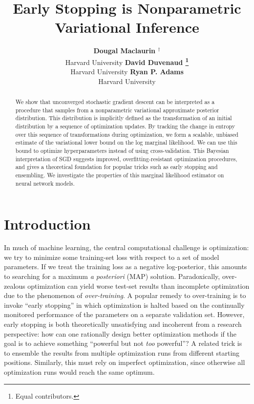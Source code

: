 \documentclass[]{article}
\title{Early Stopping is Nonparametric Variational Inference}
\author{ {\bf Dougal Maclaurin $^\dagger$} \\
Harvard University
\And
{\bf David Duvenaud \thanks{ \hspace{1em}Equal contributors.}}  \\
Harvard University
\And
{\bf Ryan P. Adams}   \\
Harvard University
}
\begin{document}
\maketitle

\begin{abstract}
We show that unconverged stochastic gradient descent 
can be interpreted as a procedure that samples from a nonparametric variational approximate posterior distribution.
This distribution is implicitly defined as the transformation of an initial distribution by a sequence of optimization updates. %
By tracking the change in entropy over this sequence of transformations during optimization, we form a scalable, unbiased estimate of the variational lower bound on the log marginal likelihood.
We can use this bound to optimize hyperparameters instead of using cross-validation.
This Bayesian interpretation of SGD suggests improved, overfitting-resistant optimization procedures, and gives a theoretical foundation for popular tricks such as early stopping and ensembling.
We investigate the properties of this marginal likelihood estimator on neural network models.
\end{abstract}

\section{Introduction}

In much of machine learning, the central computational challenge is optimization: we try to minimize some training-set loss with respect to a set of model parameters.
If we treat the training loss as a negative log-posterior, this amounts to searching for a maximum \emph{a posteriori} (MAP) solution.
Paradoxically, over-zealous optimization can yield worse test-set results than incomplete optimization due to the phenomenon of \emph{over-training}.
A popular remedy to over-training is to invoke ``early stopping'' in which optimization is halted based on the continually monitored performance of the parameters on a separate validation set.
However, early stopping is both theoretically unsatisfying and incoherent from a research perspective: how can one rationally design better optimization methods if the goal is to achieve something ``powerful but not \emph{too} powerful''?
A related trick is to ensemble the results from multiple optimization runs from different starting positions.
Similarly, this must rely on imperfect optimization, since otherwise all optimization runs would reach the same optimum.
\end{document}
